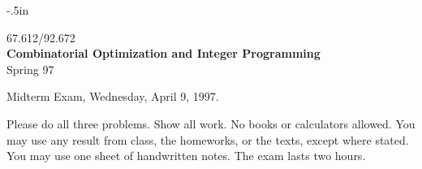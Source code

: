 
\oddsidemargin -.5in
\textwidth 7.5in
\textheight 9in
\topmargin -30pt

\pagestyle{myheadings}





\begin{center}
  {\large
  67.612/92.672 \\
  {\bf Combinatorial Optimization and Integer Programming } \\
  Spring 97}
\end{center}

\begin{center}
  Midterm Exam, Wednesday, April 9, 1997.
\end{center}

Please do all three problems. Show all work. No books or calculators allowed.
You may use any result from class, the homeworks, or the texts, except where
stated.
You may use one sheet of handwritten notes.
The exam lasts two hours.



